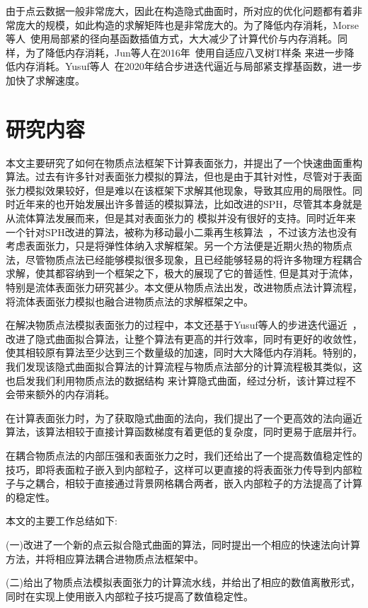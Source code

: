 由于点云数据一般非常庞大，因此在构造隐式曲面时，所对应的优化问题都有着非常庞大的规模，如此构造的求解矩阵也是非常庞大的。为了降低内存消耗，Morse等人~\cite{morse2005interpolating}使用局部紧的径向基函数插值方式，大大减少了计算代价与内存消耗。同样，为了降低内存消耗，Jun等人在2016年~\cite{wang2010adaptive}使用自适应八叉树T样条
来进一步降低内存消耗。Yusuf等人~\cite{hamza2020implicit}在2020年结合步进迭代逼近与局部紧支撑基函数，进一步加快了求解速度。
\section{研究内容}
本文主要研究了如何在物质点法框架下计算表面张力，并提出了一个快速曲面重构算法。过去有许多针对表面张力模拟的算法，但也是由于其针对性，尽管对于表面张力模拟效果较好，但是难以在该框架下求解其他现象，导致其应用的局限性。同时近年来的也开始发展出许多普适的模拟算法，比如改进的SPH，尽管其本身就是从流体算法发展而来，但是其对表面张力的
模拟并没有很好的支持。同时近年来一个针对SPH改进的算法，被称为移动最小二乘再生核算法~\cite{chen2020moving}，不过该方法也没有考虑表面张力，只是将弹性体纳入求解框架。另一个方法便是近期火热的物质点法，尽管物质点法已经能够模拟很多现象，且已经能够轻易的将许多物理方程耦合求解，使其都容纳到一个框架之下，极大的展现了它的普适性,
但是其对于流体，特别是流体表面张力研究甚少。本文便从物质点法出发，改进物质点法计算流程，将流体表面张力模拟也融合进物质点法的求解框架之中。

在解决物质点法模拟表面张力的过程中，本文还基于Yusuf等人的步进迭代逼近~\cite{hamza2020implicit}，改进了隐式曲面拟合算法，让整个算法有更高的并行效率，同时有更好的收敛性，使其相较原有算法至少达到三个数量级的加速，同时大大降低内存消耗。特别的，我们发现该隐式曲面拟合算法的计算流程与物质点法部分的计算流程极其类似，这也启发我们利用物质点法的数据结构
来计算隐式曲面，经过分析，该计算过程不会带来额外的内存消耗。

在计算表面张力时，为了获取隐式曲面的法向，我们提出了一个更高效的法向逼近算法，该算法相较于直接计算函数梯度有着更低的复杂度，同时更易于底层并行。

在耦合物质点法的内部压强和表面张力之时，我们还给出了一个提高数值稳定性的技巧，即将表面粒子嵌入到内部粒子，这样可以更直接的将表面张力传导到内部粒子与之耦合，相较于直接通过背景网格耦合两者，嵌入内部粒子的方法提高了计算的稳定性。

本文的主要工作总结如下:

(一)改进了一个新的点云拟合隐式曲面的算法，同时提出一个相应的快速法向计算方法，并将相应算法耦合进物质点法框架中。

(二)给出了物质点法模拟表面张力的计算流水线，并给出了相应的数值离散形式，同时在实现上使用嵌入内部粒子技巧提高了数值稳定性。

